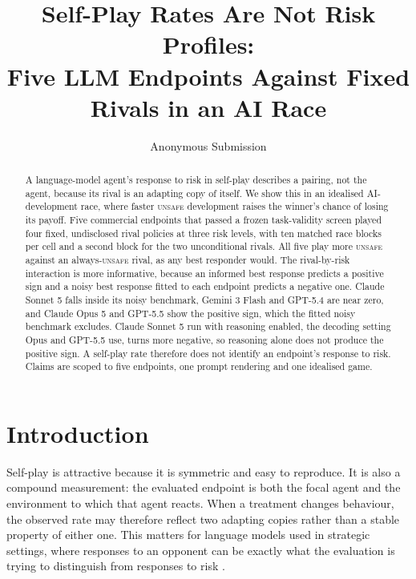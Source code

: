 \documentclass{article}
\title{Self-Play Rates Are Not Risk Profiles:\\Five LLM Endpoints Against Fixed Rivals in an AI Race}
\author{
    Anonymous Submission
}
\newcommand{\Unsafe}{\textsc{unsafe}}
\DeclareRobustCommand{\citep}[1]{\cite{#1}}
\begin{document}
\maketitle

\begin{abstract}
A language-model agent's response to risk in self-play describes a pairing, not
the agent, because its rival is an adapting copy of itself. We show this in an
idealised AI-development race, where faster \Unsafe{} development raises the
winner's chance of losing its payoff. Five commercial endpoints that passed a
frozen task-validity screen played four fixed, undisclosed rival policies at
three risk levels, with ten matched race blocks per cell and a second block for
the two unconditional rivals. All five play more \Unsafe{} against an
always-\Unsafe{} rival, as any best responder would. The rival-by-risk
interaction is more informative, because an informed best response predicts a
positive sign and a noisy best response fitted to each endpoint predicts a
negative one. Claude Sonnet 5 falls inside its noisy benchmark, Gemini 3 Flash
and GPT-5.4 are near zero, and Claude Opus 5 and GPT-5.5 show the positive sign,
which the fitted noisy benchmark excludes. Claude Sonnet 5 run with reasoning
enabled, the decoding setting Opus and GPT-5.5 use, turns more negative, so
reasoning alone does not produce the positive sign. A self-play rate therefore
does not identify an endpoint's response to risk. Claims are scoped to five
endpoints, one prompt rendering and one idealised game.
\end{abstract}

\section{Introduction}
\label{sec:introduction}

Self-play is attractive because it is symmetric and easy to reproduce. It is
also a compound measurement: the evaluated endpoint is both the focal agent and
the environment to which that agent reacts. When a treatment changes behaviour,
the observed rate may therefore reflect two adapting copies rather than a stable
property of either one. This matters for language models used in strategic
settings, where responses to an opponent can be exactly what the evaluation is
trying to distinguish from responses to risk
\citep{lekeasNashSuppression2026,herrStrategicBias2024,playing_repeated_games_with_llms}.
\end{document}
